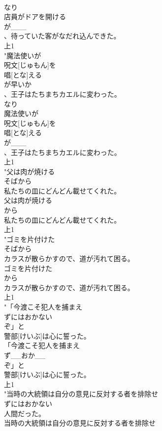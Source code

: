 \documentclass[8pt]{extreport}
\begin{document}
\begin{CJK}{UTF8}{min}
\\	なり
\\	店員がドアを開ける
\\	が___
\\	、待っていた客がなだれ込んできた。
\\	上1
\\	"魔法使いが
\\	呪文[じゅもん]を
\\	唱[とな]える
\\	が早いか
\\	、王子はたちまちカエルに変わった。
\\	なり
\\	魔法使いが
\\	呪文[じゅもん]を
\\	唱[とな]える
\\	が___
\\	、王子はたちまちカエルに変わった。
\\	上1
\\	"父は肉が焼ける
\\	そばから
\\	私たちの皿にどんどん載せてくれた。
\\	父は肉が焼ける
\\	から
\\	私たちの皿にどんどん載せてくれた。
\\	上1
\\	"ゴミを片付けた
\\	そばから
\\	カラスが散らかすので、道が汚れて困る。
\\	ゴミを片付けた
\\	から
\\	カラスが散らかすので、道が汚れて困る。
\\	上1
\\	"「今渡こそ犯人を捕まえ
\\	ずにはおかない
\\	ぞ」と
\\	警部[けいぶ]は心に誓った。
\\	「今渡こそ犯人を捕まえ
\\	ず__おか__
\\	ぞ」と
\\	警部[けいぶ]は心に誓った。
\\	上1
\\	"当時の大統領は自分の意見に反対する者を排除せ
\\	ずにはおかない
\\	人間だった。
\\	当時の大統領は自分の意見に反対する者を排除せ

\end{CJK}
\end{document}
